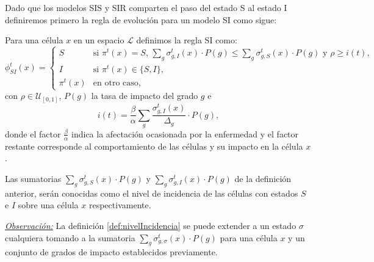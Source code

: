Dado que los modelos SIS y SIR comparten el paso del estado S al estado I definiremos primero la regla de evolución para un modelo SI como sigue:

\begin{definition}\label{def:reglaSI}
Para una célula $x$ en un espacio $\mathcal{L}$ definimos la regla SI como:
\begin{equation}
    \phi_{SI}^t(x)=\left\{\begin{array}{ll}
        S & \text{si }\pi^t(x)=S\text{, }\sum_g{\sigma_{g,I}^t(x)\cdot P(g)}\leq \sum_g{\sigma_{g,S}^t(x)\cdot P(g)}\text{ y }\rho\geq i(t),\\
        I & \text{si }\pi^t(x)\in\{S,I\}\text{,} \\
        \pi^t(x) & \text{en otro caso,}
    \end{array}\right.
\end{equation}
con $\rho\in\mathcal{U}_{[0,1]}$, $P(g)$ la tasa de impacto del grado $g$ e
\begin{equation}
    i(t) = \frac{\beta}{\alpha}\sum_g{\frac{\sigma_{g,I}^t(x)}{\Delta_g}}\cdot P(g),
\end{equation}
donde el factor $\frac{\beta}{\alpha}$ indica la afectación ocasionada por la enfermedad y el factor restante corresponde al comportamiento de las células y su impacto en la célula $x$.
\end{definition}

\begin{definition}\label{def:nivelIncidencia}
Las sumatorias $\sum_g{\sigma_{g,S}^t(x)\cdot P(g)}$ y $\sum_g{\sigma_{g,I}^t(x)\cdot P(g)}$ de la definición anterior, serán conocidas como el nivel de incidencia de las células con estados $S$ e $I$ sobre una célula $x$ respectivamente.
\end{definition}

\underline{\textit{Observación:}} La definición \ref{def:nivelIncidencia} se puede extender a un estado $\sigma$ cualquiera tomando a la sumatoria $\sum_g{\sigma_{g,\sigma}^t(x)\cdot P(g)}$ para una célula $x$ y un conjunto de grados de impacto establecidos previamente.

